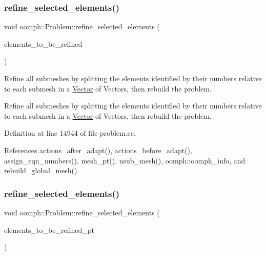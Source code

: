 \mbox{\label{classoomph_1_1Problem_a2f4ca0c03520c5c827f49ede74321684}} 
\subsubsection{\texorpdfstring{refine\+\_\+selected\+\_\+elements()}{refine\_selected\_elements()}\hspace{0.1cm}{\footnotesize\ttfamily [5/6]}}
{\footnotesize\ttfamily void oomph\+::\+Problem\+::refine\+\_\+selected\+\_\+elements (\begin{DoxyParamCaption}\item[{const \hyperlink{classoomph_1_1Vector}{Vector}$<$ \hyperlink{classoomph_1_1Vector}{Vector}$<$ unsigned $>$ $>$ \&}]{elements\+\_\+to\+\_\+be\+\_\+refined }\end{DoxyParamCaption})}



Refine all submeshes by splitting the elements identified by their numbers relative to each submesh in a \hyperlink{classoomph_1_1Vector}{Vector} of Vectors, then rebuild the problem. 

Refine all submeshes by splitting the elements identified by their numbers relative to each submesh in a \hyperlink{classoomph_1_1Vector}{Vector} of Vectors, then rebuild the problem. 

Definition at line 14944 of file problem.\+cc.



References actions\+\_\+after\+\_\+adapt(), actions\+\_\+before\+\_\+adapt(), assign\+\_\+eqn\+\_\+numbers(), mesh\+\_\+pt(), nsub\+\_\+mesh(), oomph\+::oomph\+\_\+info, and rebuild\+\_\+global\+\_\+mesh().

\mbox{\label{classoomph_1_1Problem_a5ac59318b06d2cc210f1e1064d21ba45}} 
\subsubsection{\texorpdfstring{refine\+\_\+selected\+\_\+elements()}{refine\_selected\_elements()}\hspace{0.1cm}{\footnotesize\ttfamily [6/6]}}
{\footnotesize\ttfamily void oomph\+::\+Problem\+::refine\+\_\+selected\+\_\+elements (\begin{DoxyParamCaption}\item[{const \hyperlink{classoomph_1_1Vector}{Vector}$<$ \hyperlink{classoomph_1_1Vector}{Vector}$<$ \hyperlink{classoomph_1_1RefineableElement}{Refineable\+Element} $\ast$$>$ $>$ \&}]{elements\+\_\+to\+\_\+be\+\_\+refined\+\_\+pt }\end{DoxyParamCaption})}



